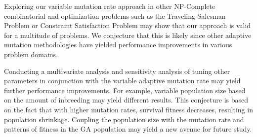 \documentclass[conference]{IEEEtran}
\begin{document}
Exploring our variable mutation rate approach in other NP-Complete combinatorial and optimization problems such as the Traveling Salesman Problem or Constraint Satisfaction Problem may show that our approach is valid for a multitude of problems. We conjecture that this is likely since other adaptive mutation methodologies have yielded performance improvements in various problem domains.

Conducting a multivariate analysis and sensitivity analysis of tuning other parameters in conjunction with the variable adaptive mutation rate may yield further performance improvements. For example, variable population size based on the amount of inbreeding may yield different results. This conjecture is based on the fact that with higher mutation rates, survival fitness decreases, resulting in population shrinkage. Coupling the population size with the mutation rate and patterns of fitness in the GA population may yield a new avenue for future study.




%
%
%


\def\V{\rm vol.~}
\def\N{no.~}
\def\pp{pp.~}
\def\Pot{\it Proc. }
\def\IJCNN{\it IEEE World Congress On Compulational Intelligence\rm }
\def\ACC{\it Beijing International Convention Center\rm }
\def\SMC{\it IEEE Trans. Systems\rm , \it Man\rm , and \it Cybernetics\rm } %

\def\handb{ \it Handbook of Intelligent Control: Neural\rm , \it
    Fuzzy\rm , \it and Adaptive Approaches \rm }
\end{document}
